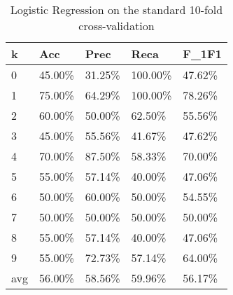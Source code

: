 \documentclass{article}
\begin{document}
\begin{table}[h]
	\centering
	\caption{Logistic Regression on the standard 10-fold cross-validation}
	\begin{tabular}{|l|l|l|l|l|}
\hline
\textbf{k} & \textbf{Acc} & \textbf{Prec} & \textbf{Reca} & \textbf{F\_1F1} \\ \hline
0          & 45.00\%      & 31.25\%       & 100.00\%      & 47.62\%         \\ \hline
1          & 75.00\%      & 64.29\%       & 100.00\%      & 78.26\%         \\ \hline
2          & 60.00\%      & 50.00\%       & 62.50\%       & 55.56\%         \\ \hline
3          & 45.00\%      & 55.56\%       & 41.67\%       & 47.62\%         \\ \hline
4          & 70.00\%      & 87.50\%       & 58.33\%       & 70.00\%         \\ \hline
5          & 55.00\%      & 57.14\%       & 40.00\%       & 47.06\%         \\ \hline
6          & 50.00\%      & 60.00\%       & 50.00\%       & 54.55\%         \\ \hline
7          & 50.00\%      & 50.00\%       & 50.00\%       & 50.00\%         \\ \hline
8          & 55.00\%      & 57.14\%       & 40.00\%       & 47.06\%         \\ \hline
9          & 55.00\%      & 72.73\%       & 57.14\%       & 64.00\%         \\ \hline
avg        & 56.00\%      & 58.56\%       & 59.96\%       & 56.17\%         \\ \hline
\end{tabular}
\end{table}
\end{document}
